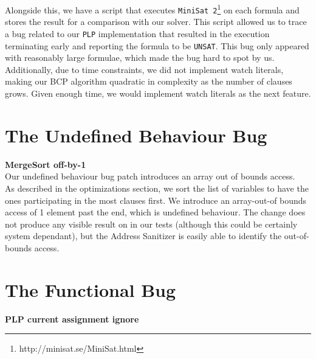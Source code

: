 \documentclass[a4paper]{article}
\begin{document}
Alongside this, we have a script that executes \texttt{MiniSat 2}\footnote{http://minisat.se/MiniSat.html} on each formula and stores the result for a comparison with our solver. This script allowed us to trace a bug related to our \texttt{PLP} implementation that resulted in the execution terminating early and reporting the formula to be \texttt{UNSAT}. This bug only appeared with reasonably large formulae, which made the bug hard to spot by us.\\
Additionally, due to time constraints, we did not implement watch literals, making our BCP algorithm quadratic in complexity as the number of clauses grows. Given enough time, we would implement watch literals as the next feature.


\section{The Undefined Behaviour Bug}

\textbf{MergeSort off-by-1} \\

Our undefined behaviour bug patch introduces an array out of bounds access. \\

As described in the optimizations section, we sort the list of variables to have the ones participating in the most clauses first. We introduce an array-out-of bounds access of 1 element past the end, which is undefined behaviour.
The change does not produce any visible result on in our tests (although this could be certainly system dependant), but the Address Sanitizer is easily able to identify the out-of-bounds access.

\section{The Functional Bug}


\textbf{PLP current assignment ignore} \\
\end{document}
